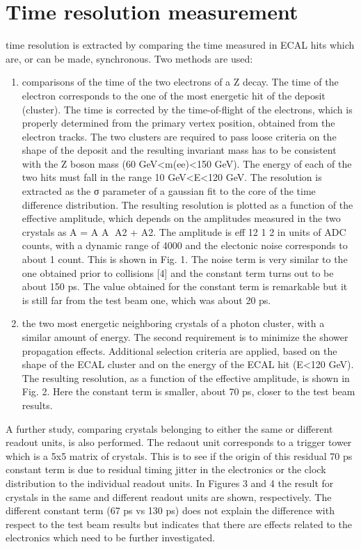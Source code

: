\documentclass[journal]{IEEEtran}
\begin{document}
\section{Time resolution measurement}
 time resolution is extracted by comparing the time measured in ECAL hits which are, or can be made, synchronous. Two methods are used:
\begin{enumerate}
\item comparisons of the time of the two electrons of a Z decay. The time of the electron corresponds to the one of the most energetic hit of the deposit (cluster). The time is corrected by the time-of-flight of the electrons, which is properly determined from the primary vertex position, obtained from the electron tracks. The two clusters are required to pass loose criteria on the shape of the deposit and the resulting invariant mass has to be consistent with the Z boson mass (60 GeV<m(ee)<150 GeV). The energy of each of the two hits must fall in the range 10 GeV<E<120 GeV. The resolution is extracted as the σ parameter of a gaussian fit to the core of the time difference distribution. The resulting resolution is plotted as a function of the effective amplitude, which depends on
the amplitudes measured in the two crystals as A = A A 􏰂A2 + A2. The amplitude is eff 12 1 2
in units of ADC counts, with a dynamic range of 4000 and the electonic noise corresponds to about 1 count. This is shown in Fig. 1. The noise term is very similar to the one obtained prior to collisions [4] and the constant term turns out to be about 150 ps. The value obtained for the constant term is remarkable but it is still far from the test beam one, which was about 20 ps.

\item the two most energetic neighboring crystals of a photon cluster, with a similar amount of energy. The second requirement is to minimize the shower propagation effects. Additional selection criteria are applied, based on the shape of the ECAL cluster
and on the energy of the ECAL hit (E<120 GeV). The resulting resolution, as a function of the effective amplitude, is shown in Fig. 2. Here the constant term is smaller, about 70 ps, closer to the test beam results.
\end{enumerate}

A further study, comparing crystals belonging to either the same or different readout units, is also performed. The redaout unit corresponds to a trigger tower which is a 5x5 matrix of crystals. This is to see if the origin of this residual 70 ps constant term is due to residual timing jitter in the electronics or the clock distribution to the individual readout units. In Figures 3 and 4 the result for crystals in the same and different readout units are shown, respectively. The different constant term (67 ps vs 130 ps) does not explain the difference with respect to the test beam results but indicates that there are effects related to the electronics which need to be further investigated.
\end{document}
